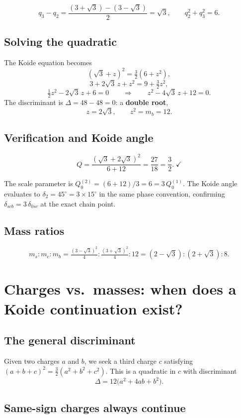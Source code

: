 \documentclass[11pt]{article}
\begin{document}
\[
  q_3 - q_2 = \frac{(3+\sqrt3)-(3-\sqrt3)}{2} = \sqrt{3},
  \qquad q_2^2 + q_3^2 = 6.
\]

\subsection{Solving the quadratic}

The Koide equation becomes
\[
  (\sqrt{3}+z)^2 = \tfrac{3}{2}(6+z^2),
\]
\[
  3 + 2\sqrt{3}\,z + z^2 = 9 + \tfrac{3}{2}z^2,
\]
\[
  \tfrac{1}{2}z^2 - 2\sqrt{3}\,z + 6 = 0
  \qquad\Longrightarrow\qquad
  z^2 - 4\sqrt{3}\,z + 12 = 0.
\]
The discriminant is $\Delta = 48 - 48 = 0$: a \textbf{double root},
\[
  \boxed{z = 2\sqrt{3}, \qquad z^2 = m_b = 12.}
\]

\subsection{Verification and Koide angle}

\[
  Q = \frac{(\sqrt{3}+2\sqrt{3})^2}{6 + 12}
  = \frac{27}{18} = \frac{3}{2}.\;\checkmark
\]

The scale parameter is $Q_0^{(2)} = (6+12)/3 = 6 = 3\,Q_0^{(1)}$.
The Koide angle evaluates to $\delta_2 = 45^\circ = 3\times 15^\circ$
in the same phase convention, confirming
$\delta_{scb} = 3\,\delta_{0sc}$ at the exact chain point.

\subsection{Mass ratios}

\[
  m_s : m_c : m_b
  = \tfrac{(3-\sqrt3)^2}{4} : \tfrac{(3+\sqrt3)^2}{4} : 12
  = (2-\sqrt{3}) : (2+\sqrt{3}) : 8.
\]

\section{Charges vs.\ masses: when does a Koide continuation exist?}

\subsection{The general discriminant}

Given two charges $a$ and $b$,
we seek a third charge $c$ satisfying
$(a+b+c)^2 = \tfrac{3}{2}(a^2+b^2+c^2)$.
This is a quadratic in $c$ with discriminant
\[
  \boxed{\Delta = 12\bigl(a^2 + 4ab + b^2\bigr).}
\]

\subsection{Same-sign charges always continue}
\end{document}
